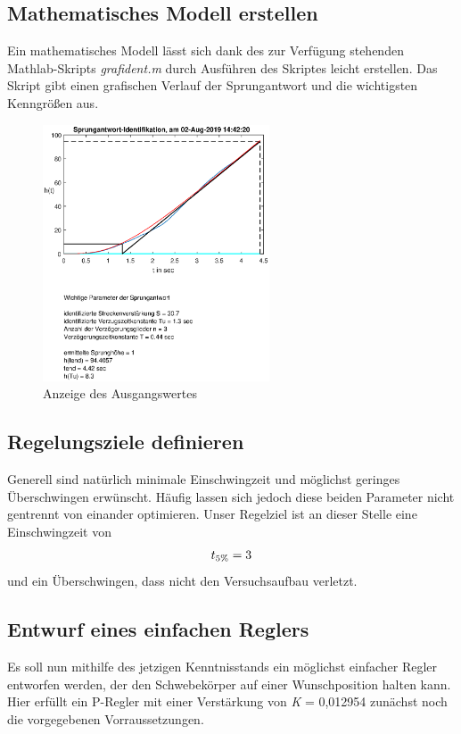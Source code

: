 \documentclass[10pt]{scrartcl}
\begin{document}
\subsection{Mathematisches Modell erstellen}
Ein mathematisches Modell lässt sich dank des zur Verfügung stehenden Mathlab-Skripts \textit {grafident.m} durch Ausführen des Skriptes leicht erstellen. Das Skript gibt einen grafischen Verlauf der Sprungantwort und die wichtigsten Kenngrößen aus.

\begin{figure}[H]
	\centering
	\includegraphics[width=0.6\textwidth]{SchwMod}
	\caption{Anzeige des Ausgangswertes}
	\label{img:grafik-dummy}
\end{figure}



\subsection{Regelungsziele definieren}
Generell sind natürlich minimale Einschwingzeit und möglichst geringes Überschwingen erwünscht. Häufig lassen sich jedoch diese beiden Parameter nicht gentrennt von einander optimieren. Unser Regelziel ist an dieser Stelle eine Einschwingzeit von
\begin{align}
t\textsubscript{5\%} = 3
\end{align}
 und ein Überschwingen, dass nicht den Versuchsaufbau verletzt.

\subsection {Entwurf eines einfachen Reglers}
Es soll nun mithilfe des jetzigen Kenntnisstands ein möglichst einfacher Regler entworfen werden, der den Schwebekörper auf einer Wunschposition halten kann. Hier erfüllt ein P-Regler mit einer Verstärkung von \textit K = 0,012954 zunächst noch die vorgegebenen Vorraussetzungen.
\end{document}
